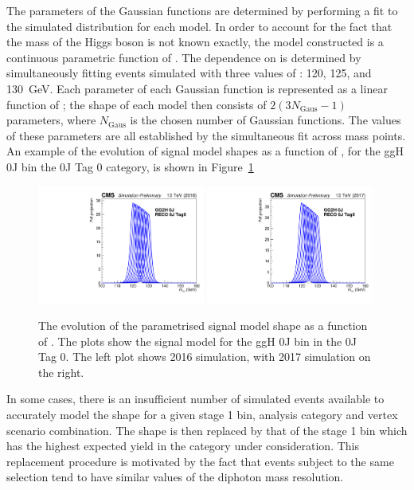 The parameters of the Gaussian functions are determined by performing a fit 
to the simulated \mgg distribution for each model.
In order to account for the fact that the mass of the Higgs boson is not known exactly, 
the model constructed is a continuous parametric function of \mH.
The dependence on \mH is determined by simultaneously fitting events simulated with 
three values of \mH: 120, 125, and \SI{130}{GeV}.
Each parameter of each Gaussian function is represented as a linear function of \mH; 
the shape of each model then consists of $2\left(3N_{\textrm{Gaus}}-1\right)$ parameters, 
where $N_{\textrm{Gaus}}$ is the chosen number of Gaussian functions.
The values of these parameters are all established by the simultaneous fit across mass points.
An example of the evolution of signal model shapes as a function of \mH, 
for the ggH 0J bin the 0J Tag 0 category, is shown in Figure~\ref{fig:sigbkg_interp}

\begin{figure}[hptb]
\centering
\includegraphics[width=0.49\textwidth]{Figures/SigBkg/GG2H_0J_RECO_0J_Tag0_interp_2016.pdf}
\includegraphics[width=0.49\textwidth]{Figures/SigBkg/GG2H_0J_RECO_0J_Tag0_interp_2017.pdf}
\caption{
  The evolution of the parametrised signal model shape as a function of \mH.
  The plots show the signal model for the ggH 0J bin in the 0J Tag 0.
  The left plot shows 2016 simulation, with 2017 simulation on the right.
}
\label{fig:sigbkg_interp}
\end{figure}

In some cases, there is an insufficient number of simulated events available 
to accurately model the shape for a given stage 1 bin, 
analysis category and vertex scenario combination. %
The shape is then replaced by that of the stage 1 bin 
which has the highest expected yield in the category under consideration.
This replacement procedure is motivated by the fact that events subject to the same selection
tend to have similar values of the diphoton mass resolution.

